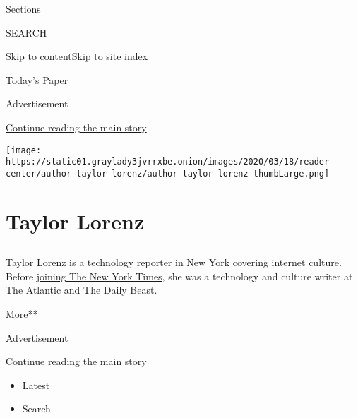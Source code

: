 Sections

SEARCH

\protect\hyperlink{site-content}{Skip to
content}\protect\hyperlink{site-index}{Skip to site index}

\href{https://myaccount.nytimes3xbfgragh.onion/auth/login?response_type=cookie\&client_id=vi}{}

\href{https://www.nytimes3xbfgragh.onion/section/todayspaper}{Today's
Paper}

Advertisement

\protect\hyperlink{after-top}{Continue reading the main story}

\texttt{[image: https://static01.graylady3jvrrxbe.onion/images/2020/03/18/reader-center/author-taylor-lorenz/author-taylor-lorenz-thumbLarge.png]}

\hypertarget{taylor-lorenz}{%
\section{Taylor Lorenz}\label{taylor-lorenz}}

\hypertarget{section}{%
\subsection{}\label{section}}

Taylor Lorenz is a technology reporter in New York covering internet
culture. Before
\href{https://www.nytco.com/press/taylor-lorenz-to-join-styles/}{joining
The New York Times}, she was a technology and culture writer at The
Atlantic and The Daily Beast.

More**

Advertisement

\protect\hyperlink{after-mid1}{Continue reading the main story}

\begin{itemize}
\tightlist
\item
  \protect\hyperlink{stream-panel}{Latest}
\item
  Search
\end{itemize}

